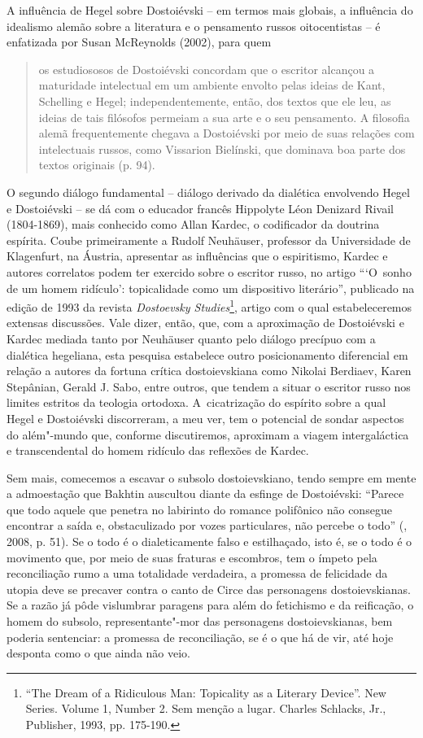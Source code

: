 {A influência de Hegel sobre Dostoiévski -- em termos mais globais, a
influência do idealismo alemão sobre a literatura e o pensamento russos
oitocentistas -- é enfatizada por Susan McReynolds (2002), para quem

\begin{quote}
os estudiososos de Dostoiévski concordam que o escritor alcançou a
maturidade intelectual em um ambiente envolto pelas ideias de Kant,
Schelling e Hegel; independentemente, então, dos textos que ele leu, as
ideias de tais filósofos permeiam a sua arte e o seu pensamento. A
filosofia alemã frequentemente chegava a Dostoiévski por meio de suas
relações com intelectuais russos, como Vissarion Bielínski, que dominava
boa parte dos textos originais (p. 94).
\end{quote}

O segundo diálogo fundamental -- diálogo derivado da dialética
envolvendo Hegel e Dostoiévski -- se dá com o educador francês Hippolyte
Léon Denizard Rivail (1804-1869), mais conhecido como Allan Kardec, o
codificador da doutrina espírita. Coube primeiramente a Rudolf
Neuhäuser, professor da Universidade de Klagenfurt, na Áustria,
apresentar as influências que o espiritismo, Kardec e autores correlatos
podem ter exercido sobre o escritor russo, no artigo ```O~sonho de um
homem ridículo': topicalidade como um dispositivo literário'', publicado
na edição de 1993 da revista \emph{Dostoevsky Studies}\footnote{``The
  Dream of a Ridiculous Man: Topicality as a Literary Device''. New
  Series. Volume 1, Number 2. Sem menção a lugar. Charles Schlacks, Jr.,
  Publisher, 1993, pp. 175-190.}, artigo com o qual estabeleceremos
extensas discussões. Vale dizer, então, que, com a aproximação de
Dostoiévski e Kardec mediada tanto por Neuhäuser quanto pelo diálogo
precípuo com a dialética hegeliana, esta pesquisa estabelece outro
posicionamento diferencial em relação a autores da fortuna crítica
dostoievskiana como Nikolai Berdiaev, Karen Stepânian, Gerald J. Sabo,
entre outros, que tendem a situar o escritor russo nos limites estritos
da teologia ortodoxa. A~cicatrização do espírito sobre a qual Hegel e
Dostoiévski discorreram, a meu ver, tem o potencial de sondar aspectos
do além"-mundo que, conforme discutiremos, aproximam a viagem
intergaláctica e transcendental do homem ridículo das reflexões de
Kardec.

Sem mais, comecemos a escavar o subsolo dostoievskiano, tendo sempre em
mente a admoestação que Bakhtin auscultou diante da esfinge de
Dostoiévski: ``Parece que todo aquele que penetra no labirinto do
romance polifônico não consegue encontrar a saída e, obstaculizado por
vozes particulares, não percebe o todo'' (, 2008, p. 51). Se o
todo é o dialeticamente falso e estilhaçado, isto é, se o todo é o
movimento que, por meio de suas fraturas e escombros, tem o ímpeto pela
reconciliação rumo a uma totalidade verdadeira, a promessa de felicidade
da utopia deve se precaver contra o canto de Circe das personagens
dostoievskianas. Se a razão já pôde vislumbrar paragens para além do
fetichismo e da reificação, o homem do subsolo, representante"-mor das
personagens dostoievskianas, bem poderia sentenciar: a promessa de
reconciliação, se é o que há de vir, até hoje desponta como o que ainda
não veio.

}
